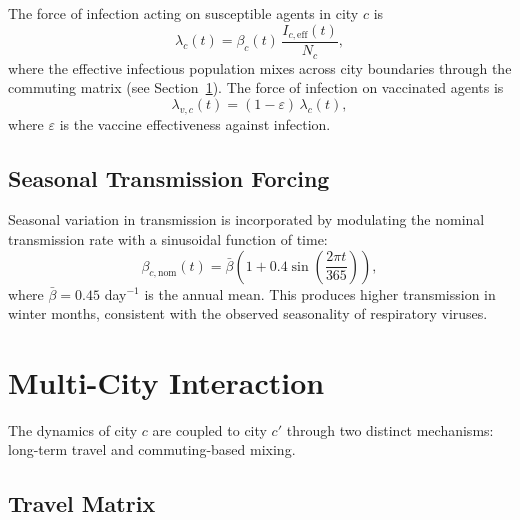 The force of infection acting on susceptible agents in city $c$ is
\begin{equation}
  \lambda_c(t) = \beta_c(t)\,\frac{I_{c,\mathrm{eff}}(t)}{N_c},
  \label{eq:foi}
\end{equation}
where the effective infectious population mixes across city boundaries through the commuting matrix (see Section~\ref{sec:intercity}).
The force of infection on vaccinated agents is
\begin{equation}
  \lambda_{v,c}(t) = (1 - \varepsilon)\,\lambda_c(t),
  \label{eq:foiv}
\end{equation}
where $\varepsilon$ is the vaccine effectiveness against infection.

\subsection{Seasonal Transmission Forcing}
\label{sec:seasonal}

Seasonal variation in transmission is incorporated by modulating the nominal transmission rate with a sinusoidal function of time:
\begin{equation}
  \beta_{c,\mathrm{nom}}(t) = \bar{\beta}\left(1 + 0.4\sin\!\left(\frac{2\pi t}{365}\right)\right),
\end{equation}
where $\bar{\beta} = 0.45$ day$^{-1}$ is the annual mean.
This produces higher transmission in winter months, consistent with the observed seasonality of respiratory viruses.

\section{Multi-City Interaction}
\label{sec:intercity}

The dynamics of city $c$ are coupled to city $c'$ through two distinct mechanisms: long-term travel and commuting-based mixing.

\subsection{Travel Matrix}
\label{sec:travel}

